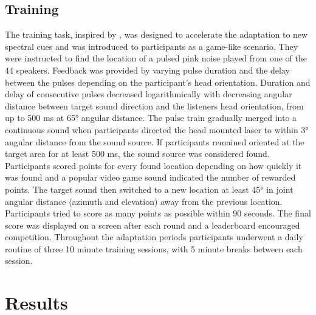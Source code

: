 \documentclass[preprint]{JASA}
\begin{document}
\subsection{Training}
The training task, inspired by \citet{trapeau_fast_2016}, was designed to accelerate the adaptation to new spectral cues and was introduced to participants as a game-like scenario. They were instructed to find the location of a pulsed pink noise played from one of the 44 speakers. Feedback was provided by varying pulse duration and the delay between the pulses depending on the participant’s head orientation. Duration and delay of consecutive pulses decreased logarithmically with decreasing angular distance between target sound direction and the listeners head orientation, from up to 500 ms at 65° angular distance. The pulse train gradually merged into a continuous sound when participants directed the head mounted laser to within 3° angular distance from the sound source. If participants remained oriented at the target area for at least 500 ms, the sound source was considered found. Participants scored points for every found location depending on how quickly it was found and a popular video game sound indicated the number of rewarded points. The target sound then switched to a new location at least 45° in joint angular distance (azimuth and elevation) away from the previous location. Participants tried to score as many points as possible within 90 seconds. The final score was displayed on a screen after each round and a leaderboard encouraged competition. Throughout the adaptation periods participants underwent a daily routine of three 10 minute training sessions, with 5 minute breaks between each session. 

\section{\label{sec:3} Results}
\end{document}
